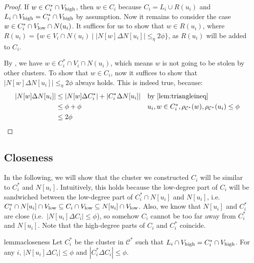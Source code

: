 \begin{proof}
If $w \in C^{*}_i \cap V_{\operatorname{high}}$, then $w \in C_i$ because $C_i = L_i \cup R(u_i)$ and $L_i \cap V_{\operatorname{high}} = C^{*}_i \cap V_{\operatorname{high}}$ by assumption. Now it remains to consider the case $w \in C^{*}_i \cap V_{\operatorname{low}} \cap N(u_i)$. It suffices for us to show that $w \in R(u_i)$, where $R(u_i) = \{ w \in V_i \cap N(u_i) \mid |N[w] \Delta N[u_i] | \leq_{\eta} 2\phi  \}$, as $R(u_i)$ will be added to $C_i$. 


By , we have $w \in C^{*}_i \cap V_i \cap N(u_i)$, which means $w$ is not going to be stolen by other clusters. To show that $w \in C_i$, now it suffices to show that $|N[w] \Delta N[u_i]| \leq_{\eta} 2\phi$ always holds. This is indeed true, because:
\begin{align*}
|N[w] \Delta N[u_i]| &\leq |N[w] \Delta C^{*}_i| + |C^{*}_i \Delta N[u_i]| && \mbox{by \Cref{lem:triangleineq}} \\
&\leq \phi + \phi && \mbox{$u_i, w \in C^{*}_i,\rho_{\mathcal{C}^{*}}(w), \rho_{\mathcal{C}^{*}}(u_i) \leq \phi$} \\
&\leq 2\phi
\end{align*}
\end{proof}
\subsection{Closeness}
In the following, we will show that the cluster we constructed $C_i$ will be similar to $C^{*}_i$ and $N[u_i]$. Intuitively, this holds because the low-degree part of $C_i$ will be sandwiched between the low-degree part of $C^{*}_i \cap N[u_i]$ and $N[u_i]$, i.e.~$C^{*}_i \cap N[u_i] \cap V_{\operatorname{low}} \subseteq C_i \cap V_{\operatorname{low}} \subseteq N[u_i] \cap V_{\operatorname{low}}$. Also, we know that $N[u_i]$ and $C^{*}_i$ are close (i.e.~$|N[u_i] \Delta C_i| \leq \phi$), so somehow $C_i$ cannot be too far away from $C^{*}_i$ and $N[u_i]$. Note that the high-degree parts of $C_i$ and $C^{*}_i$ coincide. 
\begin{restatable}{lemma}{closeness}\label{lem:closeness} Let $C^{*}_i$ be the cluster in $\mathcal{C}^{*}$ such that $L_i \cap V_{\operatorname{high}} = {C}^{*}_{i} \cap V_{\operatorname{high}}$. For any $i$, $|N[u_i] \Delta C_i| \leq \phi$ and $|C^{*}_i \Delta C_{i}| \leq \phi$. 
\end{restatable}

